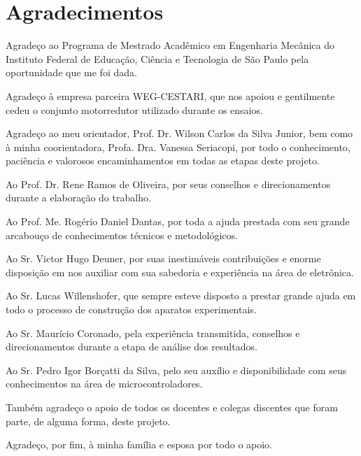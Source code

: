\documentclass[
	12pt,				
	oneside,			
	a4paper,			
	english,			
	brazil,	
	sumario=abnt-6027-2012		
	]{abntex2ppgsi}
\begin{document}
\frenchspacing 



\imprimircapa

\imprimirfolhaderosto

\chapter*{Agradecimentos}

Agradeço ao Programa de Mestrado Acadêmico em Engenharia Mecânica do Instituto Federal de Educação, Ciência e Tecnologia de São Paulo pela oportunidade que me foi dada. 

Agradeço à empresa parceira WEG-CESTARI, que nos apoiou e gentilmente cedeu o conjunto motorredutor utilizado durante os ensaios.

Agradeço ao meu orientador, Prof. Dr. Wilson Carlos da Silva Junior, bem como à minha coorientadora, Profa. Dra. Vanessa Seriacopi, por todo o conhecimento, paciência e valorosos encaminhamentos em todas as etapas deste projeto.

Ao Prof. Dr. Rene Ramos de Oliveira, por seus conselhos e direcionamentos durante a elaboração do trabalho.

Ao Prof. Me. Rogério Daniel Dantas, por toda a ajuda prestada com seu grande arcabouço de conhecimentos técnicos e metodológicos. 

Ao Sr. Victor Hugo Deuner, por suas inestimáveis contribuições e enorme disposição em nos auxiliar com sua sabedoria e experiência na área de eletrônica. 

Ao Sr. Lucas Willenshofer, que sempre esteve disposto a prestar grande ajuda em todo o processo de construção dos aparatos experimentais.

Ao Sr. Maurício Coronado, pela experiência transmitida, conselhos e direcionamentos durante a etapa de análise dos resultados. 

Ao Sr. Pedro Igor Borçatti da Silva, pelo seu auxílio e disponibilidade com seus conhecimentos na área de microcontroladores. 

Também agradeço o apoio de todos os docentes e colegas discentes que foram parte, de alguma forma, deste projeto.

Agradeço, por fim, à minha família e esposa por todo o apoio.
\end{document}
